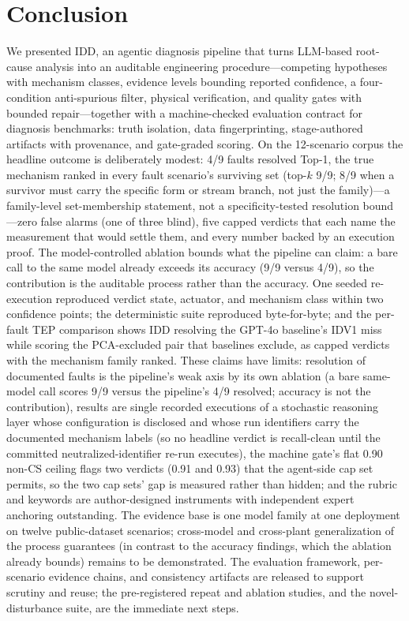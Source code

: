 \documentclass[preprint,10pt]{elsarticle}
\begin{document}
\section{Conclusion}
\label{sec:conclusion}

We presented IDD, an agentic diagnosis pipeline that turns LLM-based root-cause analysis into an auditable engineering procedure---competing hypotheses with mechanism classes, evidence levels bounding reported confidence, a four-condition anti-spurious filter, physical verification, and quality gates with bounded repair---together with a machine-checked evaluation contract for diagnosis benchmarks: truth isolation, data fingerprinting, stage-authored artifacts with provenance, and gate-graded scoring. On the 12-scenario corpus the headline outcome is deliberately modest: 4/9 faults resolved Top-1, the true mechanism ranked in every fault scenario's surviving set (top-$k$ 9/9; 8/9 when a survivor must carry the specific form or stream branch, not just the family)---a family-level set-membership statement, not a specificity-tested resolution bound---zero false alarms (one of three blind), five capped verdicts that each name the measurement that would settle them, and every number backed by an execution proof. The model-controlled ablation bounds what the pipeline can claim: a bare call to the same model already exceeds its accuracy (9/9 versus 4/9), so the contribution is the auditable process rather than the accuracy. One seeded re-execution reproduced verdict state, actuator, and mechanism class within two confidence points; the deterministic suite reproduced byte-for-byte; and the per-fault TEP comparison shows IDD resolving the GPT-4o baseline's IDV1 miss while scoring the PCA-excluded pair that baselines exclude, as capped verdicts with the mechanism family ranked.
These claims have limits: resolution of documented faults is the pipeline's weak axis by its own ablation (a bare same-model call scores 9/9 versus the pipeline's 4/9 resolved; accuracy is not the contribution), results are single recorded executions of a stochastic reasoning layer whose configuration is disclosed and whose run identifiers carry the documented mechanism labels (so no headline verdict is recall-clean until the committed neutralized-identifier re-run executes), the machine gate's flat 0.90 non-CS ceiling flags two verdicts (0.91 and 0.93) that the agent-side cap set permits, so the two cap sets' gap is measured rather than hidden; and the rubric and keywords are author-designed instruments with independent expert anchoring outstanding. The evidence base is one model family at one deployment on twelve public-dataset scenarios; cross-model and cross-plant generalization of the process guarantees (in contrast to the accuracy findings, which the ablation already bounds) remains to be demonstrated.
The evaluation framework, per-scenario evidence chains, and consistency artifacts are released to support scrutiny and reuse; the pre-registered repeat and ablation studies, and the novel-disturbance suite, are the immediate next steps.
\end{document}
